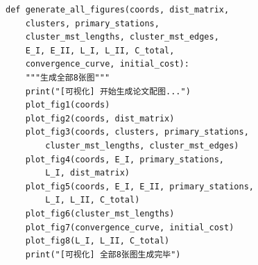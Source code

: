 \documentclass[12pt,a4paper]{ctexart}
\theoremstyle{definition}
\theoremstyle{plain}
\theoremstyle{remark}
\begin{document}
\begin{lstlisting}[caption={\texttt{visualization.py}：论文图表生成}]
def generate_all_figures(coords, dist_matrix,
    clusters, primary_stations,
    cluster_mst_lengths, cluster_mst_edges,
    E_I, E_II, L_I, L_II, C_total,
    convergence_curve, initial_cost):
    """生成全部8张图"""
    print("[可视化] 开始生成论文配图...")
    plot_fig1(coords)
    plot_fig2(coords, dist_matrix)
    plot_fig3(coords, clusters, primary_stations,
        cluster_mst_lengths, cluster_mst_edges)
    plot_fig4(coords, E_I, primary_stations,
        L_I, dist_matrix)
    plot_fig5(coords, E_I, E_II, primary_stations,
        L_I, L_II, C_total)
    plot_fig6(cluster_mst_lengths)
    plot_fig7(convergence_curve, initial_cost)
    plot_fig8(L_I, L_II, C_total)
    print("[可视化] 全部8张图生成完毕")
\end{lstlisting}

\endgroup
\end{document}
